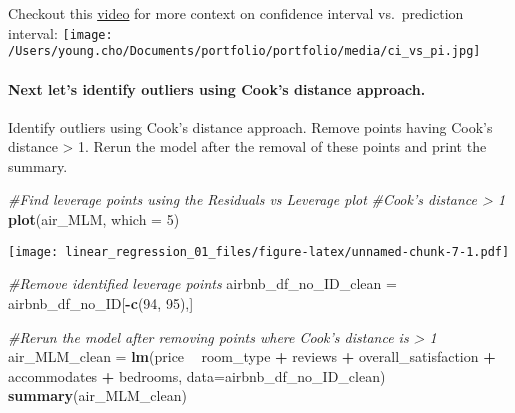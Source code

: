 \documentclass[]{article}
\newenvironment{Shaded}{\begin{snugshade}}{\end{snugshade}}
\newcommand{\CommentTok}[1]{\textcolor[rgb]{0.56,0.35,0.01}{\textit{#1}}}
\newcommand{\DataTypeTok}[1]{\textcolor[rgb]{0.13,0.29,0.53}{#1}}
\newcommand{\DecValTok}[1]{\textcolor[rgb]{0.00,0.00,0.81}{#1}}
\newcommand{\KeywordTok}[1]{\textcolor[rgb]{0.13,0.29,0.53}{\textbf{#1}}}
\newcommand{\NormalTok}[1]{#1}
\newcommand{\OperatorTok}[1]{\textcolor[rgb]{0.81,0.36,0.00}{\textbf{#1}}}
\newcommand{\StringTok}[1]{\textcolor[rgb]{0.31,0.60,0.02}{#1}}
\let\oldparagraph\paragraph
\renewcommand{\paragraph}[1]{\oldparagraph{#1}\mbox{}}
\begin{document}
Checkout this
\href{https://www.youtube.com/watch?feature=player_embedded\&v=o0UESA3UZss}{video}
for more context on confidence interval vs.~prediction interval:
\texttt{[image: /Users/young.cho/Documents/portfolio/portfolio/media/ci\_vs\_pi.jpg]}

\hypertarget{next-lets-identify-outliers-using-cooks-distance-approach.}{%
\paragraph{Next let's identify outliers using Cook's distance
approach.}\label{next-lets-identify-outliers-using-cooks-distance-approach.}}

Identify outliers using Cook's distance approach. Remove points having
Cook's distance \textgreater{} 1. Rerun the model after the removal of
these points and print the summary.

\begin{Shaded}
\begin{Highlighting}[]
\CommentTok{#Find leverage points using the Residuals vs Leverage plot}
\CommentTok{#Cook's distance > 1 }
\KeywordTok{plot}\NormalTok{(air_MLM, }\DataTypeTok{which =} \DecValTok{5}\NormalTok{)}
\end{Highlighting}
\end{Shaded}

\texttt{[image: linear\_regression\_01\_files/figure-latex/unnamed-chunk-7-1.pdf]}

\begin{Shaded}
\begin{Highlighting}[]
\CommentTok{#Remove identified leverage points}
\NormalTok{airbnb_df_no_ID_clean =}\StringTok{ }\NormalTok{airbnb_df_no_ID[}\OperatorTok{-}\KeywordTok{c}\NormalTok{(}\DecValTok{94}\NormalTok{, }\DecValTok{95}\NormalTok{),]}

\CommentTok{#Rerun the model after removing points where Cook's distance is > 1}
\NormalTok{air_MLM_clean =}\StringTok{ }\KeywordTok{lm}\NormalTok{(price }\OperatorTok{~}\StringTok{ }\NormalTok{room_type }\OperatorTok{+}\StringTok{ }\NormalTok{reviews }\OperatorTok{+}\StringTok{ }\NormalTok{overall_satisfaction }\OperatorTok{+}\StringTok{ }\NormalTok{accommodates }\OperatorTok{+}\StringTok{ }\NormalTok{bedrooms, }\DataTypeTok{data=}\NormalTok{airbnb_df_no_ID_clean)}
\KeywordTok{summary}\NormalTok{(air_MLM_clean)}
\end{Highlighting}
\end{Shaded}
\end{document}
